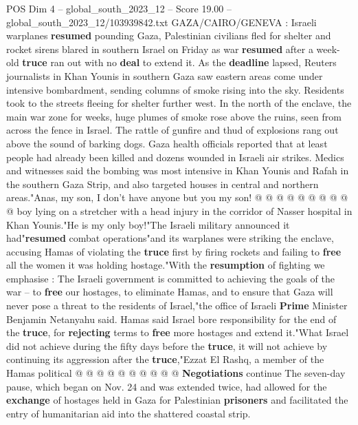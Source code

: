 \begin{textsample}{POS Dim 4 – global\_south\_2023\_12 – Score 19.00 – global\_south\_2023\_12/103939842.txt}  \label{ex:f4_pos_142}
GAZA/CAIRO/GENEVA : Israeli warplanes \textbf{resumed} pounding Gaza, Palestinian civilians fled for shelter and rocket sirens blared in southern Israel on Friday as war \textbf{resumed} after a week-old \textbf{truce} ran out with no \textbf{deal} to extend it.
As the \textbf{deadline} lapsed, Reuters journalists in Khan Younis in southern Gaza saw eastern areas come under intensive bombardment, sending columns of smoke rising into the sky.
Residents took to the streets fleeing for shelter further west.
In the north of the enclave, the main war zone for weeks, huge plumes of smoke rose above the ruins, seen from across the fence in Israel.
The rattle of gunfire and thud of explosions rang out above the sound of barking dogs.
Gaza health officials reported that at least people had already been killed and dozens wounded in Israeli air strikes.
Medics and witnesses said the bombing was most intensive in Khan Younis and Rafah in the southern Gaza Strip, and also targeted houses in central and northern areas."Anas, my son, I don't have anyone but you my son! @ @ @ @ @ @ @ @ @ @ boy lying on a stretcher with a head injury in the corridor of Nasser hospital in Khan Younis."He is my only boy!"The Israeli military announced it had"\textbf{resumed} combat operations"and its warplanes were striking the enclave, accusing Hamas of violating the \textbf{truce} first by firing rockets and failing to \textbf{free} all the women it was holding hostage."With the \textbf{resumption} of fighting we emphasise : The Israeli government is committed to achieving the goals of the war -- to \textbf{free} our hostages, to eliminate Hamas, and to ensure that Gaza will never pose a threat to the residents of Israel,"the office of Israeli \textbf{Prime} Minister Benjamin Netanyahu said.
Hamas said Israel bore responsibility for the end of the \textbf{truce}, for \textbf{rejecting} terms to \textbf{free} more hostages and extend it."What Israel did not achieve during the fifty days before the \textbf{truce}, it will not achieve by continuing its aggression after the \textbf{truce},"Ezzat El Rashq, a member of the Hamas political @ @ @ @ @ @ @ @ @ @ \textbf{Negotiations} continue The seven-day pause, which began on Nov. 24 and was extended twice, had allowed for the \textbf{exchange} of hostages held in Gaza for Palestinian \textbf{prisoners} and facilitated the entry of humanitarian aid into the shattered coastal strip.

\end{textsample}
